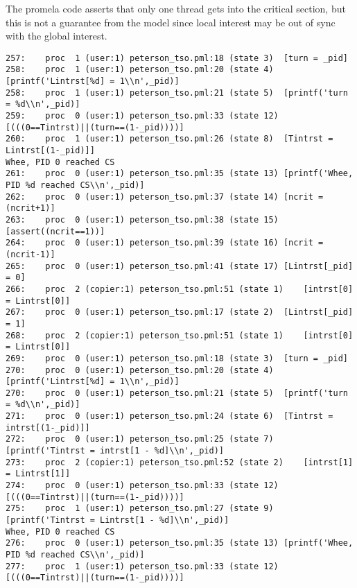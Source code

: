 \documentclass[11pt]{article}
\begin{document}
\begin{enumerate}
\begin{minipage}{\minpagw}
{{      The promela code asserts that only one thread gets into the critical section, but this is not a guarantee from the model since local interest may be out of sync with the global interest.
    }%
  }%
\end{minipage}

\begin{verbatim}
257:	proc  1 (user:1) peterson_tso.pml:18 (state 3)	[turn = _pid]
258:	proc  1 (user:1) peterson_tso.pml:20 (state 4)	[printf('Lintrst[%d] = 1\\n',_pid)]
258:	proc  1 (user:1) peterson_tso.pml:21 (state 5)	[printf('turn = %d\\n',_pid)]
259:	proc  0 (user:1) peterson_tso.pml:33 (state 12)	[(((0==Tintrst)||(turn==(1-_pid))))]
260:	proc  1 (user:1) peterson_tso.pml:26 (state 8)	[Tintrst = Lintrst[(1-_pid)]]
Whee, PID 0 reached CS
261:	proc  0 (user:1) peterson_tso.pml:35 (state 13)	[printf('Whee, PID %d reached CS\\n',_pid)]
262:	proc  0 (user:1) peterson_tso.pml:37 (state 14)	[ncrit = (ncrit+1)]
263:	proc  0 (user:1) peterson_tso.pml:38 (state 15)	[assert((ncrit==1))]
264:	proc  0 (user:1) peterson_tso.pml:39 (state 16)	[ncrit = (ncrit-1)]
265:	proc  0 (user:1) peterson_tso.pml:41 (state 17)	[Lintrst[_pid] = 0]
266:	proc  2 (copier:1) peterson_tso.pml:51 (state 1)	[intrst[0] = Lintrst[0]]
267:	proc  0 (user:1) peterson_tso.pml:17 (state 2)	[Lintrst[_pid] = 1]
268:	proc  2 (copier:1) peterson_tso.pml:51 (state 1)	[intrst[0] = Lintrst[0]]
269:	proc  0 (user:1) peterson_tso.pml:18 (state 3)	[turn = _pid]
270:	proc  0 (user:1) peterson_tso.pml:20 (state 4)	[printf('Lintrst[%d] = 1\\n',_pid)]
270:	proc  0 (user:1) peterson_tso.pml:21 (state 5)	[printf('turn = %d\\n',_pid)]
271:	proc  0 (user:1) peterson_tso.pml:24 (state 6)	[Tintrst = intrst[(1-_pid)]]
272:	proc  0 (user:1) peterson_tso.pml:25 (state 7)	[printf('Tintrst = intrst[1 - %d]\\n',_pid)]
273:	proc  2 (copier:1) peterson_tso.pml:52 (state 2)	[intrst[1] = Lintrst[1]]
274:	proc  0 (user:1) peterson_tso.pml:33 (state 12)	[(((0==Tintrst)||(turn==(1-_pid))))]
275:	proc  1 (user:1) peterson_tso.pml:27 (state 9)	[printf('Tintrst = Lintrst[1 - %d]\\n',_pid)]
Whee, PID 0 reached CS
276:	proc  0 (user:1) peterson_tso.pml:35 (state 13)	[printf('Whee, PID %d reached CS\\n',_pid)]
277:	proc  1 (user:1) peterson_tso.pml:33 (state 12)	[(((0==Tintrst)||(turn==(1-_pid))))]

\end{verbatim}
\end{enumerate}
\end{document}
